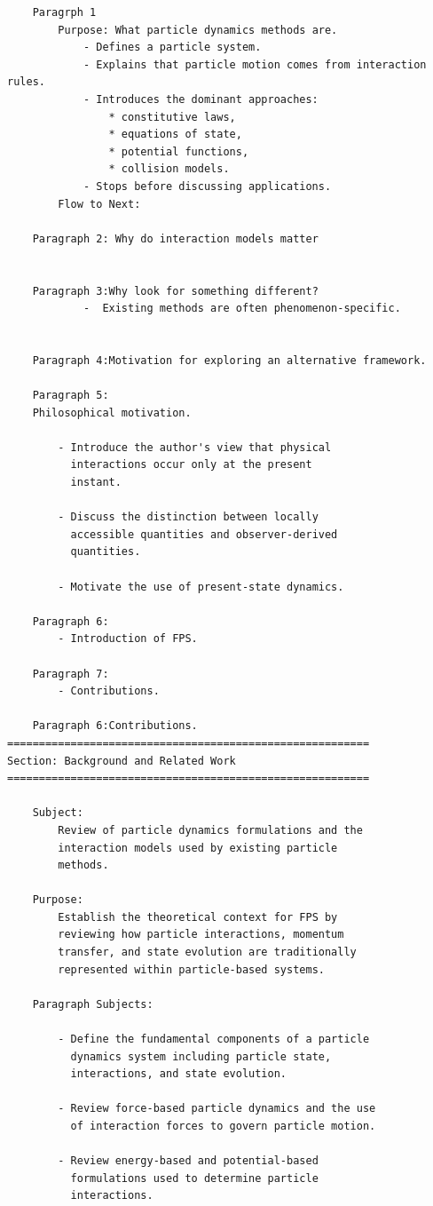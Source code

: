 \begin{verbatim}
	Paragrph 1
		Purpose: What particle dynamics methods are.
			- Defines a particle system.
			- Explains that particle motion comes from interaction rules.
			- Introduces the dominant approaches:
				* constitutive laws,
				* equations of state,
				* potential functions,
				* collision models.
			- Stops before discussing applications.
		Flow to Next:

	Paragraph 2: Why do interaction models matter


	Paragraph 3:Why look for something different?
			-  Existing methods are often phenomenon-specific.
    

	Paragraph 4:Motivation for exploring an alternative framework.

	Paragraph 5:
    Philosophical motivation.

        - Introduce the author's view that physical
          interactions occur only at the present
          instant.

        - Discuss the distinction between locally
          accessible quantities and observer-derived
          quantities.

        - Motivate the use of present-state dynamics.

	Paragraph 6:
	    - Introduction of FPS.

	Paragraph 7:
    	- Contributions.

	Paragraph 6:Contributions.
=========================================================
Section: Background and Related Work
=========================================================

    Subject:
        Review of particle dynamics formulations and the
        interaction models used by existing particle
        methods.

    Purpose:
        Establish the theoretical context for FPS by
        reviewing how particle interactions, momentum
        transfer, and state evolution are traditionally
        represented within particle-based systems.

    Paragraph Subjects:

        - Define the fundamental components of a particle
          dynamics system including particle state,
          interactions, and state evolution.

        - Review force-based particle dynamics and the use
          of interaction forces to govern particle motion.

        - Review energy-based and potential-based
          formulations used to determine particle
          interactions.


\end{verbatim}

